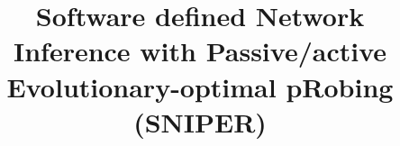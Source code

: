 \documentclass[10pt, conference, letterpaper]{IEEEtran}
\begin{document}
\title{Software defined Network Inference with Passive/active Evolutionary-optimal pRobing (SNIPER)}


\maketitle









% 

 
 

%
%


%
\end{document}
